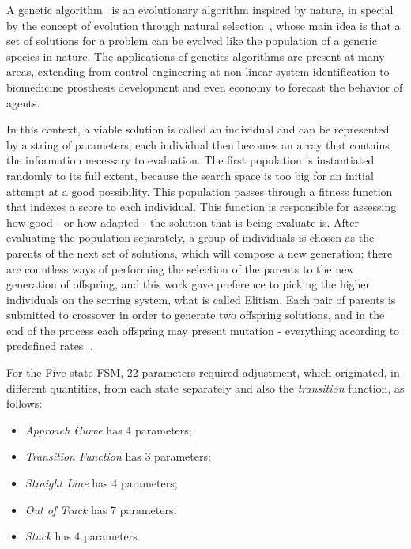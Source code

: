 	A genetic algorithm~\cite{GA} is an evolutionary algorithm inspired by nature, in special by the concept of
	evolution through natural selection~\cite{Darwin}, whose main idea is that a set of solutions for a problem can
	be evolved like the population of a generic species in nature. The applications of genetics algorithms are
	present at many areas, extending from control engineering at non-linear system identification to biomedicine
	prosthesis development and even economy to forecast the behavior of agents.
	
	In this context, a viable solution is called an individual and can be represented by a string of parameters; each
	individual then becomes an array that contains the information necessary to evaluation. The first population is
	instantiated randomly to its full extent, because the search space is too big for an initial attempt at a good
	possibility. This population passes through a fitness function that indexes a score to each individual. This
	function is responsible for assessing how good - or how adapted - the solution that is being evaluate is. After
	evaluating the population separately, a group of individuals is chosen as the parents of the next set of
	solutions, which will compose a new generation; there are countless ways of performing the selection of the
	parents to the new generation of offspring, and this work gave preference to picking the higher individuals on the
	scoring system, what is called Elitism. Each pair of parents is submitted to
	crossover in order to generate two offspring solutions, and in the end of the process each offspring may
	present mutation - everything according to predefined rates. .
	
	For the Five-state FSM, 22 parameters required adjustment, which originated, in different quantities, from each
	state separately and also the \emph{transition} function, as follows:
	
	\begin{itemize}
		
		\item \emph{Approach Curve} has 4 parameters;
		
		\item \emph{Transition Function} has 3 parameters;
		
		\item \emph{Straight Line} has 4 parameters;
		
		\item \emph{Out of Track} has 7 parameters;
		
		\item \emph{Stuck} has 4 parameters.
		
	\end{itemize}
	

